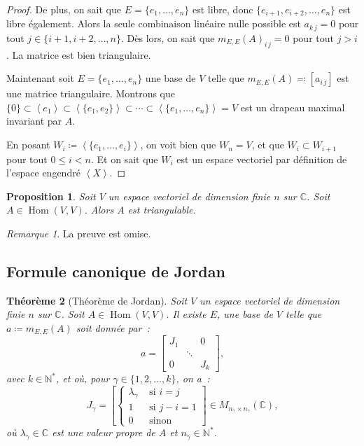 \documentclass{article}
\DeclareMathOperator{\Hom}{Hom}
\newcommand{\N}{\mathbb N}
\newcommand{\C}{\mathbb C}
\newcommand{\eng}[1]{\left\langle#1\right\rangle}
\newcommand{\M}[3]{M_{#1 \times #2}(#3)}
\newtheorem{thm}{Théorème}[section]
\newtheorem{prp}[thm]{Proposition}
\theoremstyle{definition}
\theoremstyle{remark}
\newtheorem*{rmq}{Remarque}
\begin{document}
\begin{proof}
		De plus, on sait que $E = \{e_1, \dotsc, e_n\}$ est libre, donc $\{e_{i+1}, e_{i+2}, \dotsc, e_n\}$ est libre également. Alors la seule combinaison linéaire
		nulle possible est $a_{k\,j} = 0$ pour tout $j \in \{i+1, i+2, \ldots, n\}$. Dès lors, on sait que $m_{E, E}(A)_{i\,j} = 0$ pour tout $j > i$.
		La matrice est bien triangulaire.

		Maintenant soit $E = \{e_1, \dotsc, e_n\}$ une base de $V$ telle que $m_{E, E}(A) \eqqcolon [a_{i\,j}]$ est une matrice triangulaire. Montrons que
		$\{0\}  \subset \eng {e_1} \subset \eng {\{e_1, e_2\}} \subset \dotsb \subset \eng {\{e_1, \dotsc, e_n\}} = V$ est un drapeau maximal invariant par $A$.

		En posant $W_i \coloneqq \eng {\{e_1, \dotsc, e_i\}}$, on voit bien que $W_n = V$, et que $W_i \subset W_{i+1}$ pour tout $0 \leq i < n$. Et on sait que
		$W_i$ est un espace vectoriel par définition de l'espace engendré $\eng X$.
		\end{proof}

		\begin{prp} Soit $V$ un espace vectoriel de dimension finie $n$ sur $\C$. Soit $A \in \Hom(V,V)$. Alors $A$ est triangulable. \end{prp}

		\begin{rmq} La preuve est omise. \end{rmq}

	\subsection{Formule canonique de Jordan}
		\begin{thm}[Théorème de Jordan] Soit $V$ un espace vectoriel de dimension finie $n$ sur $\C$. Soit $A \in \Hom(V, V)$. Il existe $E$, une base de $V$
		telle que $a \coloneqq m_{E, E}(A)$ soit donnée par~:
		\[a = \begin{bmatrix}J_1 &  & 0 \\ & \ddots & \\0 & & J_k\end{bmatrix},\]
		avec $k \in \N^*$, et où, pour $\gamma \in \{1, 2, \ldots, k\}$, on a~:
		\[J_\gamma = \left[\begin{cases}\lambda_\gamma & \text{ si } i = j \\ 1 & \text{ si } j-i = 1 \\0 & \text{ sinon}\end{cases}\right] \in \M{n_\gamma}{n_\gamma}\C,\]
		où $\lambda_\gamma \in \C$ est une valeur propre de $A$ et $n_\gamma \in \N^*$.
		\end{thm}
\end{document}
